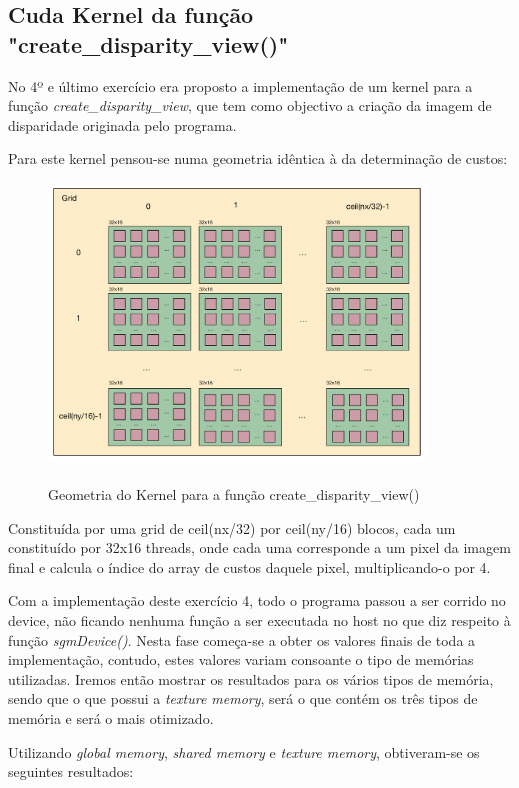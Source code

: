 \documentclass[pdftex,12pt,a4paper]{report}
\begin{document}
\subsection{Cuda Kernel da função "create\_disparity\_view()"}

No 4º e último exercício era proposto a implementação de um kernel para a função \textit{create\_disparity\_view}, que tem como objectivo a criação da imagem de disparidade originada pelo programa.

Para este kernel pensou-se numa geometria idêntica à da determinação de custos:

\begin{figure}[!htb]
\center
 \includegraphics[width=100mm,scale=1]{DetermineCosts_v1_kernel.pdf}
 \caption{\\ Geometria do Kernel para a função create\_disparity\_view()}
 \label{fig:create_v1_kernel}
\end{figure}

Constituída por uma grid de ceil(nx/32) por ceil(ny/16) blocos, cada um constituído por 32x16 threads, onde cada uma corresponde a um pixel da imagem final e calcula o índice do array de custos daquele pixel, multiplicando-o por 4.

Com a implementação deste exercício 4, todo o programa passou a ser corrido no device, não ficando nenhuma função a ser executada no host no que diz respeito à função \textit{sgmDevice()}. Nesta fase começa-se a obter os valores finais de toda a implementação, contudo, estes valores variam consoante o tipo de memórias utilizadas. Iremos então mostrar os resultados para os vários tipos de memória, sendo que o que possui a \textit{texture memory}, será o que contém os três tipos de memória e será o mais otimizado.

Utilizando \textit{global memory}, \textit{shared memory} e \textit{texture memory}, obtiveram-se os seguintes resultados:
\end{document}
